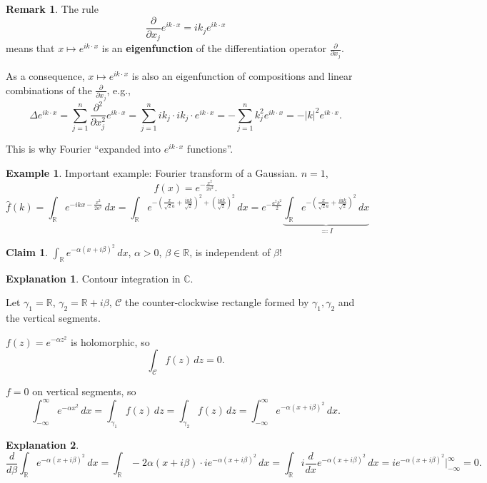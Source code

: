 \documentclass[12pt]{article}
\theoremstyle{definition}
\newtheorem*{claim*}{Claim}
\newtheorem*{remark}{Remark}
\newtheorem{explanation}{Explanation}
\newtheorem*{example*}{Example}
\begin{document}
\begin{remark}
The rule
\[\frac\partial{\partial x_j}e^{ik\cdot x}=ik_je^{ik\cdot x}\]
means that $x\mapsto e^{ik\cdot x}$ is an \textbf{eigenfunction} of the differentiation operator $\frac\partial{\partial x_j}$.

As a consequence, $x\mapsto e^{ik\cdot x}$ is also an eigenfunction of compositions and linear combinations of the $\frac\partial{\partial x_j}$, e.g.,
\[\Delta e^{ik\cdot x}=\sum_{j=1}^n\frac{\partial^2}{\partial x_j^2}e^{ik\cdot x}=\sum_{j=1}^nik_j\cdot ik_j\cdot e^{ik\cdot x}=-\sum_{j=1}^nk_j^2e^{ik\cdot x}=-|k|^2e^{ik\cdot x}.\]

This is why Fourier ``expanded into $e^{ik\cdot x}$ functions''.
\end{remark}

\begin{example*}
Important example: Fourier transform of a Gaussian. $n=1$,
\[f(x)=e^{-\frac{x^2}{2a^2}}.\]
\[\hat f(k)=\int_\mathbb Re^{-ikx-\frac{x^2}{2a^2}}\,dx=\int_\mathbb Re^{-\left(\frac x{\sqrt2a}+\frac{iak}{\sqrt2}\right)^2+\left(\frac{iak}{\sqrt2}\right)^2}\,dx=e^{-\frac{a^2k^2}2}\underbrace{\int_\mathbb Re^{-\left(\frac x{\sqrt2a}+\frac{iak}{\sqrt2}\right)^2}\,dx}_{\eqqcolon I}\]

\begin{claim*}
$\int_\mathbb Re^{-\alpha(x+i\beta)^2}\,dx$, $\alpha>0$, $\beta\in\mathbb R$, is independent of $\beta$!
\end{claim*}

\begin{explanation}
Contour integration in $\mathbb C$.

Let $\gamma_1=\mathbb R$, $\gamma_2=\mathbb R+i\beta$, $\mathcal C$ the counter-clockwise rectangle formed by $\gamma_1,\gamma_2$ and the vertical segments.

$f(z)=e^{-\alpha z^2}$ is holomorphic, so
\[\int_\mathcal Cf(z)\,dz=0.\]

$f=0$ on vertical segments, so
\[\int_{-\infty}^\infty e^{-\alpha x^2}\,dx=\int_{\gamma_1}f(z)\,dz=\int_{\gamma_2}f(z)\,dz=\int_{-\infty}^\infty e^{-\alpha(x+i\beta)^2}\,dx.\]
\end{explanation}

\begin{explanation}
\[\frac d{d\beta}\int_\mathbb Re^{-\alpha(x+i\beta)^2}\,dx=\int_\mathbb R-2\alpha(x+i\beta)\cdot ie^{-\alpha(x+i\beta)^2}\,dx=\int_\mathbb Ri\frac d{dx}e^{-\alpha(x+i\beta)^2}\,dx=ie^{-\alpha(x+i\beta)^2}\Big|_{-\infty}^\infty=0.\]


\end{explanation}
\end{example*}
\end{document}
